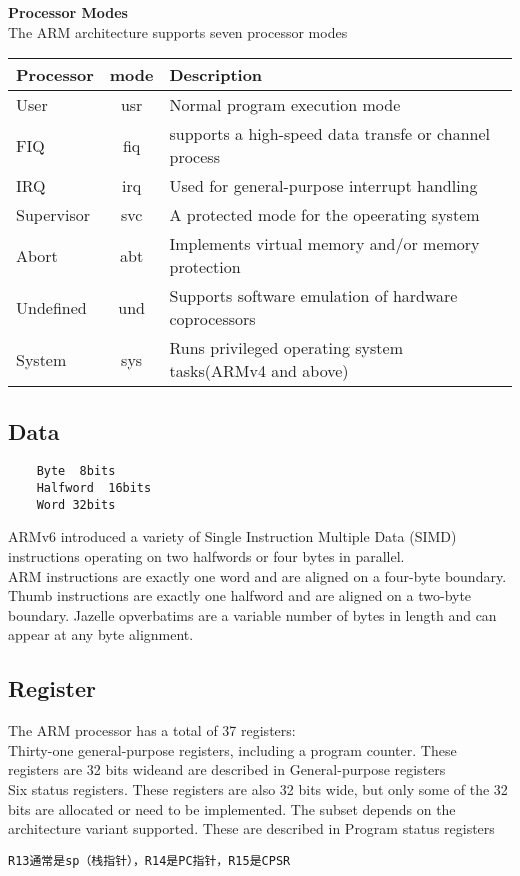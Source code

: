 \textbf{Processor Modes}\\
The ARM architecture supports seven processor modes\\
\begin{tabular}{|l|c|l|}
\hline
Processor  & mode & Description   \\\hline
User & usr & Normal program execution mode \\\hline
FIQ& fiq & supports a high-speed data transfe or channel process \\\hline
IRQ & irq & Used for general-purpose interrupt handling \\\hline
Supervisor& svc & A protected mode for the opeerating system \\\hline
Abort& abt & Implements virtual memory and/or memory protection \\\hline
Undefined& und & Supports software emulation of hardware coprocessors \\\hline
System& sys & Runs privileged operating system tasks(ARMv4 and above) \\\hline
\end{tabular}

\subsection{Data}
\begin{verbatim}
	Byte  8bits
	Halfword  16bits
	Word 32bits
\end{verbatim}
ARMv6 introduced a variety of Single Instruction Multiple Data (SIMD) instructions
operating on two halfwords or four bytes in parallel.\\
ARM instructions are exactly one word and are aligned on a four-byte boundary. Thumb instructions
are exactly one halfword and are aligned on a two-byte boundary. Jazelle opverbatims are a variable
number of bytes in length and can appear at any byte alignment.

\subsection{Register}
\noindent The ARM processor has a total of 37 registers:\\
Thirty-one general-purpose registers, including a program counter. These registers are 32 bits wideand are described in General-purpose registers \\
Six status registers. These registers are also 32 bits wide, but only some of the 32 bits are allocated or need to be implemented. The subset depends on the architecture variant supported. These are described in Program status registers\\
\begin{verbatim}
R13通常是sp（栈指针），R14是PC指针，R15是CPSR
\end{verbatim}

